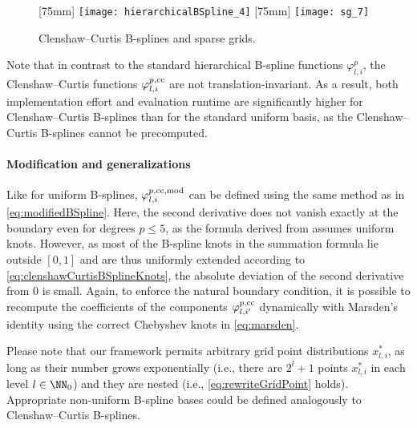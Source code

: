 \begin{figure}
  [75mm]{%
    \texttt{[image: hierarchicalBSpline\_4]}%
  }%
  \hfill%
  [75mm]{%
    \texttt{[image: sg\_7]}%
  }%
  \caption{%
    Clenshaw--Curtis B-splines and sparse grids.%
  }
  \label{fig:clenshawCurtis}
\end{figure}

Note that in contrast to the standard hierarchical B-spline functions
$\varphi_{l,i}^p$, the Clenshaw--Curtis functions
$\varphi_{l,i}^{p,\mathrm{cc}}$ are not translation-invariant.
As a result, both implementation effort and evaluation runtime
are significantly higher for Clenshaw--Curtis B-splines than
for the standard uniform basis,
as the Clenshaw--Curtis B-splines cannot be precomputed.

\paragraph{Modification and generalizations}

Like for uniform B-splines,
$\varphi_{l,i}^{p,\mathrm{cc},\mathrm{mod}}$ can be defined using the
same method as in \eqref{eq:modifiedBSpline}.
Here, the second derivative does not vanish exactly at the boundary
even for degrees $p \le 5$,
as the formula derived from  assumes uniform knots.
However, as most of the B-spline knots in the summation formula
lie outside $[0, 1]$ and are thus uniformly extended according
to \eqref{eq:clenshawCurtisBSplineKnots},
the absolute deviation of the second derivative from $0$ is small.
Again, to enforce the natural boundary condition,
it is possible to recompute the coefficients
of the components $\varphi_{l,i'}^{p,\mathrm{cc}}$
dynamically with Marsden's identity using the correct Chebyshev knots
in \eqref{eq:marsden}.

Please note that our framework permits arbitrary grid point distributions
$x_{l,i}^\ast$,
as long as their number grows exponentially
(i.e., there are $2^l + 1$ points $x_{l,i}^\ast$ in each level $l \in \NN_0$)
and they are nested
(i.e., \eqref{eq:rewriteGridPoint} holds).
Appropriate non-uniform B-spline bases could be defined analogously
to Clenshaw--Curtis B-splines.
